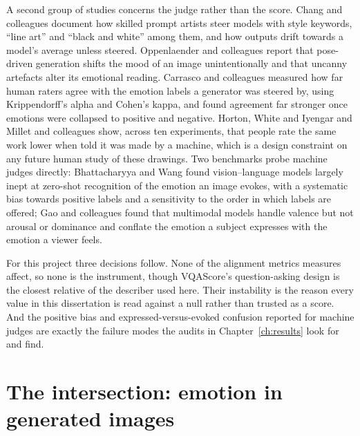 A second group of studies concerns the judge rather than the score. Chang and colleagues \cite{chang2023prompt} document how skilled prompt artists steer models with style keywords, ``line art'' and ``black and white'' among them, and how outputs drift towards a model's average unless steered. Oppenlaender and colleagues \cite{oppenlaender2024artworks} report that pose-driven generation shifts the mood of an image unintentionally and that uncanny artefacts alter its emotional reading. Carrasco and colleagues \cite{carrasco2024level} measured how far human raters agree with the emotion labels a generator was steered by, using Krippendorff's alpha and Cohen's kappa, and found agreement far stronger once emotions were collapsed to positive and negative. Horton, White and Iyengar \cite{horton2023bias} and Millet and colleagues \cite{millet2023defending} show, across ten experiments, that people rate the same work lower when told it was made by a machine, which is a design constraint on any future human study of these drawings. Two benchmarks probe machine judges directly: Bhattacharyya and Wang \cite{bhattacharyya2025evaluating} found vision--language models largely inept at zero-shot recognition of the emotion an image evokes, with a systematic bias towards positive labels and a sensitivity to the order in which labels are offered; Gao and colleagues \cite{gao2025eemo} found that multimodal models handle valence but not arousal or dominance and conflate the emotion a subject expresses with the emotion a viewer feels.

For this project three decisions follow. None of the alignment metrics measures affect, so none is the instrument, though VQAScore's question-asking design is the closest relative of the describer used here. Their instability is the reason every value in this dissertation is read against a null rather than trusted as a score. And the positive bias and expressed-versus-evoked confusion reported for machine judges are exactly the failure modes the audits in Chapter~\ref{ch:results} look for and find.

\section{The intersection: emotion in generated images}
\label{sec:lit-intersection}

